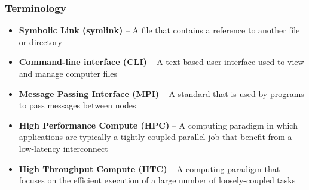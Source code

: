 \begin{frame}
	\frametitle{Terminology}
	\begin{itemize}
	\item \textbf{Symbolic Link (symlink)} -- A file that contains a reference to another file or directory
	\item \textbf{Command-line interface (CLI)} -- A text-based user interface used to view and manage computer files 
	\item \textbf{Message Passing Interface (MPI)} -- A standard that is used by programs to pass messages between nodes
	\item \textbf{High Performance Compute (HPC)} -- A computing paradigm in which applications are typically a tightly coupled parallel job that benefit from a low-latency interconnect
	\item \textbf{High Throughput Compute (HTC)} -- A computing paradigm that focuses on the efficient execution of a large number of loosely-coupled tasks
	\end{itemize}
\end{frame}



